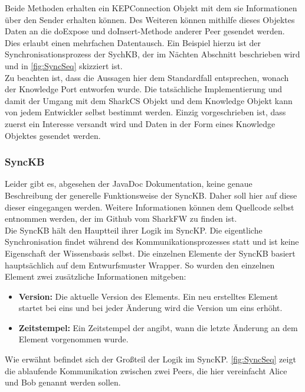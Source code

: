 \documentclass[a4paper]{article}
\begin{document}
	Beide Methoden erhalten ein KEPConnection Objekt mit dem sie Informationen 
	über den Sender erhalten können. Des Weiteren können mithilfe dieses 
	Objektes Daten an die doExpose und doInsert-Methode anderer Peer gesendet
	werden. Dies erlaubt einen mehrfachen Datentausch. Ein Beispiel hierzu ist
	der Synchronisationsprozess der SychKB, der im Nächten Abschnitt beschrieben 
	wird und in \autoref{fig:SyncSeq} skizziert ist. \\
	
	Zu beachten ist, dass die Aussagen hier dem Standardfall entsprechen, wonach
	der Knowledge Port entworfen wurde. Die tatsächliche Implementierung und
	damit der Umgang mit dem SharkCS Objekt und dem Knowledge Objekt kann von jedem
	Entwickler selbst bestimmt werden. Einzig vorgeschrieben ist, dass zuerst
	ein Interesse versandt wird und Daten in der Form eines Knowledge Objektes
	gesendet werden.
	
	\subsubsection{SyncKB}
	\label{sec:SyncKB}
	
	Leider gibt es, abgesehen der JavaDoc Dokumentation, keine genaue
	Beschreibung der generelle Funktionsweise der SyncKB. Daher soll hier auf 
	diese dieser eingegangen werden. Weitere Informationen
	können dem Quellcode selbst entnommen werden, der im Github vom SharkFW
	zu finden ist. \cite{SyncKB} \\
	
	Die SyncKB hält den Hauptteil ihrer Logik im SyncKP. Die eigentliche
	Synchronisation findet während des Kommunikationsprozesses statt und ist
	keine Eigenschaft der Wissensbasis selbst. Die einzelnen Elemente der SyncKB
	basiert hauptsächlich auf dem Entwurfsmuster Wrapper. So wurden den einzelnen
	Element zwei zusätzliche Informationen mitgeben: 
	
	\begin{itemize}
		\item \textbf{Version:} Die aktuelle Version des Elements. Ein neu 
		erstelltes Element startet bei eins und bei jeder Änderung wird die
		Version um eins erhöht.
		\item \textbf{Zeitstempel:} Ein Zeitstempel der angibt, wann die letzte
		Änderung an dem Element vorgenommen wurde.
	\end{itemize} 
	
	Wie erwähnt befindet sich der Großteil der Logik im SyncKP.
	\autoref{fig:SyncSeq} zeigt die ablaufende Kommunikation zwischen zwei
	Peers, die hier vereinfacht Alice und Bob genannt werden sollen.	
	
\end{document}
